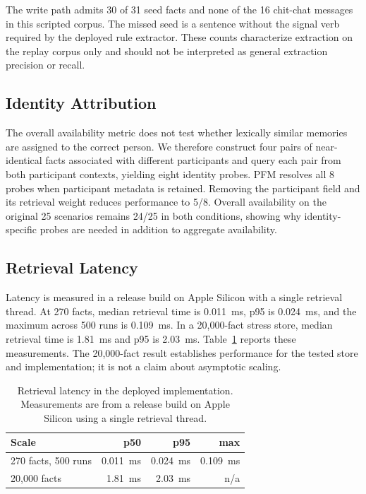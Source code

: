 \documentclass[letterpaper]{article} %
\begin{document}
The write path admits 30 of 31 seed facts and none of the 16 chit-chat messages in this scripted corpus. The missed seed is a sentence without the signal verb required by the deployed rule extractor. These counts characterize extraction on the replay corpus only and should not be interpreted as general extraction precision or recall.

\subsection{Identity Attribution}

The overall availability metric does not test whether lexically similar memories are assigned to the correct person. We therefore construct four pairs of near-identical facts associated with different participants and query each pair from both participant contexts, yielding eight identity probes. PFM resolves all 8 probes when participant metadata is retained. Removing the participant field and its retrieval weight reduces performance to 5/8. Overall availability on the original 25 scenarios remains 24/25 in both conditions, showing why identity-specific probes are needed in addition to aggregate availability.

\subsection{Retrieval Latency}

Latency is measured in a release build on Apple Silicon with a single retrieval thread. At 270 facts, median retrieval time is 0.011~ms, p95 is 0.024~ms, and the maximum across 500 runs is 0.109~ms. In a 20{,}000-fact stress store, median retrieval time is 1.81~ms and p95 is 2.03~ms. Table~\ref{tab:latency} reports these measurements. The 20{,}000-fact result establishes performance for the tested store and implementation; it is not a claim about asymptotic scaling.

\begin{table}[t]
\centering
\small
\begin{tabular}{@{}lrrr@{}}
\toprule
Scale & p50 & p95 & max \\
\midrule
270 facts, 500 runs & 0.011~ms & 0.024~ms & 0.109~ms \\
20{,}000 facts & 1.81~ms & 2.03~ms & n/a \\
\bottomrule
\end{tabular}
\caption{Retrieval latency in the deployed implementation. Measurements are from a release build on Apple Silicon using a single retrieval thread.}
\label{tab:latency}
\end{table}
\end{document}
